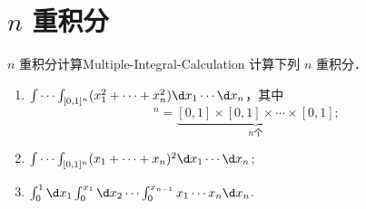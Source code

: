 \section{\texorpdfstring{$n$}{n} 重积分}

\begin{problem}{$n$ 重积分计算}{Multiple-Integral-Calculation}
    计算下列 $n$ 重积分．
    \begin{enumerate}
        \item $\int \cdots \int_{[0,1]^n} (x_1^2 + \cdots + x_n^2) \d x_1 \cdots \d x_n$，其中
              \begin{equation}
                  [0, 1]^n = \underbrace{[0, 1] \times [0, 1] \times \cdots \times [0, 1]}_{n \text{个}};
              \end{equation}
        \item $\int \cdots \int_{[0,1]^n} (x_1 + \cdots + x_n)^2 \d x_1 \cdots \d x_n$;
        \item $\int_0^1 \d x_1 \int_0^{x_1} \d x_2 \cdots \int_0^{x_{n-1}} x_1 \cdots x_n \d x_n$.
    \end{enumerate}
\end{problem}

